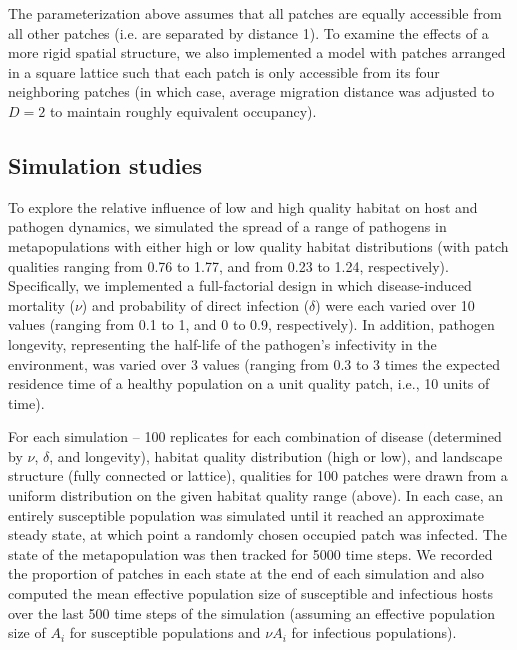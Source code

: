 \documentclass{article}
\begin{document}
The parameterization above assumes that all patches are equally accessible from all other patches (i.e. are separated by distance 1).  To examine the effects of a more rigid spatial structure, we also implemented a model with patches arranged in a square lattice such that each patch is only accessible from its four neighboring patches (in which case, average migration distance was adjusted to $D = 2$ to maintain roughly equivalent occupancy).  

\subsection{Simulation studies}

To explore the relative influence of low and high quality habitat on host and pathogen dynamics, we simulated the spread of a range of pathogens in metapopulations with either high or low quality habitat distributions (with patch qualities ranging from 0.76 to 1.77, and from 0.23 to 1.24, respectively).  Specifically, we implemented a full-factorial design in which disease-induced mortality ($\nu$) and probability of direct infection ($\delta$) were each varied over 10 values (ranging from 0.1 to 1, and 0 to 0.9, respectively).  In addition, pathogen longevity, representing the half-life of the pathogen's infectivity in the environment, was varied over 3 values (ranging from 0.3 to 3 times the expected residence time of a healthy population on a unit quality patch, i.e., 10 units of time).

For each simulation -- 100 replicates for each combination of disease (determined by $\nu$, $\delta$, and longevity), habitat quality distribution (high or low), and landscape structure (fully connected or lattice), qualities for 100 patches were drawn from a uniform distribution on the given habitat quality range (above). In each case, an entirely susceptible population was simulated until it reached an approximate steady state, at which point a randomly chosen occupied patch was infected.  The state of the metapopulation was then tracked for 5000 time steps.  We recorded the proportion of patches in each state at the end of each simulation and also computed the mean effective population size of susceptible and infectious hosts over the last 500 time steps of the simulation (assuming an effective population size of $A_i$ for susceptible populations and $\nu A_i$ for infectious populations).    
\end{document}
